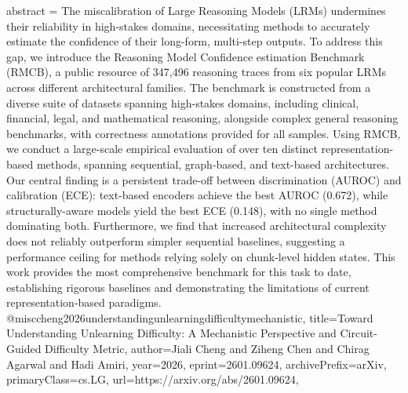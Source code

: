 {      abstract = {The miscalibration of Large Reasoning Models (LRMs) undermines their reliability in high-stakes domains, necessitating methods to accurately estimate the confidence of their long-form, multi-step outputs. To address this gap, we introduce the Reasoning Model Confidence estimation Benchmark (RMCB), a public resource of 347,496 reasoning traces from six popular LRMs across different architectural families. The benchmark is constructed from a diverse suite of datasets spanning high-stakes domains, including clinical, financial, legal, and mathematical reasoning, alongside complex general reasoning benchmarks, with correctness annotations provided for all samples. Using RMCB, we conduct a large-scale empirical evaluation of over ten distinct representation-based methods, spanning sequential, graph-based, and text-based architectures. Our central finding is a persistent trade-off between discrimination (AUROC) and calibration (ECE): text-based encoders achieve the best AUROC (0.672), while structurally-aware models yield the best ECE (0.148), with no single method dominating both. Furthermore, we find that increased architectural complexity does not reliably outperform simpler sequential baselines, suggesting a performance ceiling for methods relying solely on chunk-level hidden states. This work provides the most comprehensive benchmark for this task to date, establishing rigorous baselines and demonstrating the limitations of current representation-based paradigms.}
}@misc{cheng2026understandingunlearningdifficultymechanistic,
      title={Toward Understanding Unlearning Difficulty: A Mechanistic Perspective and Circuit-Guided Difficulty Metric}, 
      author={Jiali Cheng and Ziheng Chen and Chirag Agarwal and Hadi Amiri},
      year={2026},
      eprint={2601.09624},
      archivePrefix={arXiv},
      primaryClass={cs.LG},
      url={https://arxiv.org/abs/2601.09624},
}
